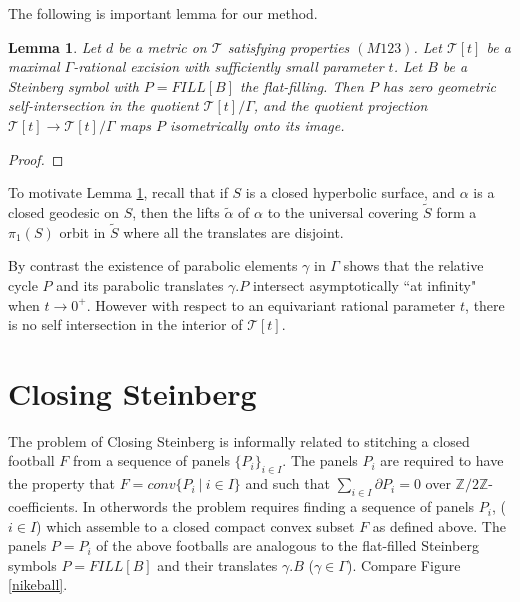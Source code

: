 \documentclass[12pt]{amsart}
\newtheorem{lem}[thm]{Lemma}
\theoremstyle{definition}
\theoremstyle{remark}
\newcommand{\bZ}{\mathbb{Z}}
\newcommand{\del}{\partial}
\newcommand{\sT}{\mathscr{T}}
\begin{document}
The following is important lemma for our method. 

\begin{lem}\label{kl}
Let $d$ be a metric on $\sT$ satisfying properties $(M123)$. Let $\sT[t]$ be a maximal $\Gamma$-rational excision with sufficiently small parameter $t$. Let $B$ be a Steinberg symbol with $P=FILL[B]$ the flat-filling. Then $P$ has zero geometric self-intersection in the quotient $\sT[t]/\Gamma$, and the quotient projection $\sT[t] \to \sT[t]/ \Gamma$ maps $P$ isometrically onto its image.
\end{lem}
\begin{proof}
\end{proof}

To motivate Lemma \ref{kl}, recall that if $S$ is a closed hyperbolic surface, and $\alpha$ is a closed geodesic on $S$, then the lifts $\tilde{\alpha}$ of $\alpha$ to the universal covering $\tilde{S}$ form a $\pi_1(S)$ orbit in $\tilde{S}$ where all the translates are disjoint. %

By contrast the existence of parabolic elements $\gamma$ in $\Gamma$ shows that the relative cycle $P$ and its parabolic translates $\gamma.P$ intersect asymptotically ``at infinity" when $t\to 0^+$. However with respect to an equivariant rational parameter $t$, there is no self intersection in the interior of $\sT[t]$.






\section{Closing Steinberg}\label{CS}
The problem of Closing Steinberg is informally related to stitching a closed football $F$ from a sequence of panels $\{P_i\}_{i\in I}$. The panels $P_i$ are required to have the property that $F=conv\{P_i~|~i\in I\}$ and such that $\sum_{i\in I} \del P_i=0$ over $\bZ/2\bZ$-coefficients. In otherwords the problem requires finding a sequence of panels $P_i$, ($i\in I$) which assemble to a closed compact convex subset $F$ as defined above. The panels $P=P_i$ of the above footballs are analogous to the flat-filled Steinberg symbols $P=FILL[B]$ and their translates $\gamma.B$ ($\gamma\in \Gamma$). Compare Figure \ref{nikeball}.
\end{document}
